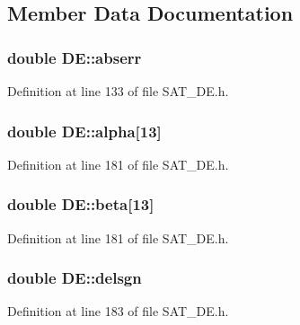 \subsection{Member Data Documentation}
\hypertarget{classDE_a9337b177c5adfeda779ceecd6b56b370}{
\subsubsection[{abserr}]{\setlength{\rightskip}{0pt plus 5cm}double D\-E\-::abserr}}\label{classDE_a9337b177c5adfeda779ceecd6b56b370}


Definition at line 133 of file S\-A\-T\-\_\-\-D\-E.\-h.

\hypertarget{classDE_ad0bf62cec063071d0773fde29d976c0e}{
\subsubsection[{alpha}]{\setlength{\rightskip}{0pt plus 5cm}double D\-E\-::alpha\mbox{[}13\mbox{]}\hspace{0.3cm}{\ttfamily [private]}}}\label{classDE_ad0bf62cec063071d0773fde29d976c0e}


Definition at line 181 of file S\-A\-T\-\_\-\-D\-E.\-h.

\hypertarget{classDE_a6db4afe37f9ebf0dce0532415c40de32}{
\subsubsection[{beta}]{\setlength{\rightskip}{0pt plus 5cm}double D\-E\-::beta\mbox{[}13\mbox{]}\hspace{0.3cm}{\ttfamily [private]}}}\label{classDE_a6db4afe37f9ebf0dce0532415c40de32}


Definition at line 181 of file S\-A\-T\-\_\-\-D\-E.\-h.

\hypertarget{classDE_a5fe0648747453fc746c8bee223d58633}{
\subsubsection[{delsgn}]{\setlength{\rightskip}{0pt plus 5cm}double D\-E\-::delsgn\hspace{0.3cm}{\ttfamily [private]}}}\label{classDE_a5fe0648747453fc746c8bee223d58633}


Definition at line 183 of file S\-A\-T\-\_\-\-D\-E.\-h.

